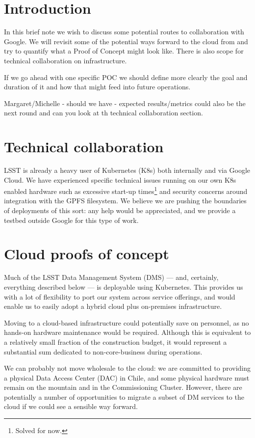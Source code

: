 \section{Introduction}
In this brief note we wish to discuss some potential routes to collaboration with Google. We will revisit some of the potential ways forward to the cloud from  and try to quantify what a Proof of Concept might look like. There is also scope for technical collaboration on infrastructure.

If we go ahead with one specific POC we should define more clearly the goal and duration of it and how that might feed into future operations.

{\color{red} Margaret/Michelle - should we have - expected results/metrics could also be the next round and can you look at th technical collaboration section. }
\section{Technical collaboration}

LSST is already a heavy user of Kubernetes (K8s) both internally and via Google Cloud.
We have experienced specific technical issues running on our own K8s enabled hardware such as excessive start-up times\footnote{Solved for now.} and security concerns around integration with the GPFS filesystem.
We believe we are pushing the boundaries of deployments of this sort: any help would be appreciated, and we provide a testbed outside Google for this type of work.

\section{Cloud proofs of concept}\label{sect:pocs}

Much of the LSST Data Management System (DMS) — and, certainly, everything described below — is deployable using Kubernetes.
This provides us with a lot of flexibility to port our system across service offerings, and would enable us to easily adopt a hybrid cloud plus on-premises infrastructure.

Moving to a cloud-based infrastructure could potentially save on personnel, as no hands-on hardware maintenance would be required.
Although this is equivalent to a relatively small fraction of the construction budget, it would represent a substantial sum dedicated to non-core-business during operations.

We can probably not move wholesale to the cloud: we are committed to providing a physical Data Access Center (DAC) in Chile, and some physical hardware must remain on the mountain and in the Commissioning Cluster.
However, there are potentially a number of opportunities to migrate a subset of DM services to the cloud if we could see a sensible way forward.

